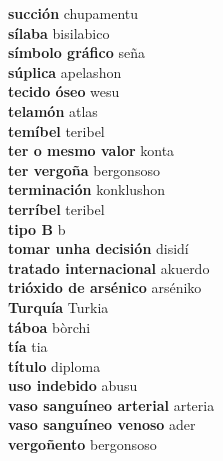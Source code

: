 \textbf{ succión  } chupamentu \\
\textbf{ sílaba  } bisilabico \\
\textbf{ símbolo gráfico  } seña \\
\textbf{ súplica  } apelashon \\
\textbf{ tecido óseo  } wesu \\
\textbf{ telamón  } atlas \\
\textbf{ temíbel  } teribel \\
\textbf{ ter o mesmo valor  } konta \\
\textbf{ ter vergoña  } bergonsoso \\
\textbf{ terminación  } konklushon \\
\textbf{ terríbel  } teribel \\
\textbf{ tipo B  } b \\
\textbf{ tomar unha decisión  } disidí \\
\textbf{ tratado internacional  } akuerdo \\
\textbf{ trióxido de arsénico  } arséniko \\
\textbf{ Turquía  } Turkia \\
\textbf{ táboa  } bòrchi \\
\textbf{ tía  } tia \\
\textbf{ título  } diploma \\
\textbf{ uso indebido  } abusu \\
\textbf{ vaso sanguíneo arterial  } arteria \\
\textbf{ vaso sanguíneo venoso  } ader \\
\textbf{ vergoñento  } bergonsoso \\
